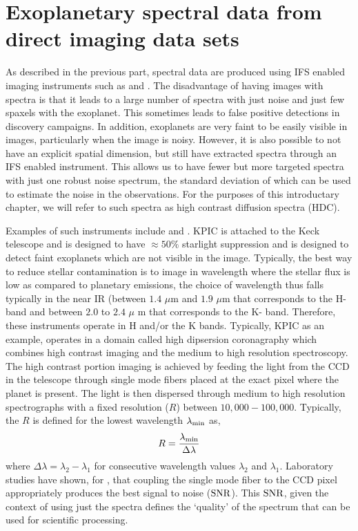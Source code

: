 \section{Exoplanetary spectral data from direct imaging data sets}
As described in the previous part, spectral data are produced using IFS enabled imaging instruments such as \citep[SINFONI, ][]{2004SINFONI} and \citep[GPI, ][]{2014MacintoshGPI}.
The disadvantage of having images with spectra is that it leads to a large number of spectra with just noise and just few spaxels with the exoplanet.
This sometimes leads to false positive detections in discovery campaigns.
In addition, exoplanets are very faint to be easily visible in images, particularly when the image is noisy.
However, it is also possible to not have an explicit spatial dimension, but still have extracted spectra through an IFS enabled instrument.
This allows us to have fewer but more targeted spectra with just one robust noise spectrum, the standard deviation of which can be used to estimate the noise in the observations.
For the purposes of this introductary chapter, we will  refer to such spectra as high contrast diffusion spectra (HDC).

Examples of such instruments include \citep[KPIC, ][]{2019KPIC} and \citep[HARMONI, ]{2022Jocou}.
KPIC is attached to the Keck telescope and is designed to have $\approx 50\%$ starlight suppression and is designed to detect faint exoplanets which are not visible in the image.
Typically, the best way to reduce stellar contamination is to image in wavelength where the stellar flux is low as compared to planetary emissions, the choice of wavelength thus falls typically in the near IR (between $1.4$ $\mu$m  and $1.9$ $\mu$m that corresponds to the H-band and between $2.0$ to $2.4$ $\mu$ m that corresponds to the K- band.
Therefore, these instruments operate in H and/or the K bands.
Typically, KPIC as an example, operates in a domain called high dipsersion coronagraphy which combines high contrast imaging and the medium to high resolution spectroscopy.
The high contrast portion imaging is achieved by feeding the light from the CCD in the telescope through single mode fibers placed at the exact pixel where the planet is present.
The light is then dispersed through medium to high resolution spectrographs with a fixed resolution ($R$) between $10,000-100,000$.
Typically, the $R$ is defined for the lowest wavelength $\lambda_{\rm{min}}$ as,
\begin{equation}
    R =\dfrac{\lambda_{\rm{min}}}{\Delta \lambda}
\end{equation}
where $\Delta \lambda=\lambda_2-\lambda_1$ for consecutive wavelength values $\lambda_2$ and $\lambda_1$.
Laboratory studies have shown, for \citep[e.g][]{2021Calvin}, that coupling the single mode fiber to the CCD pixel appropriately produces the best signal to noise ($\rm{SNR}$).
This $\rm{SNR}$, given the context of using just the spectra defines the `quality' of the spectrum that can be used for scientific processing.

